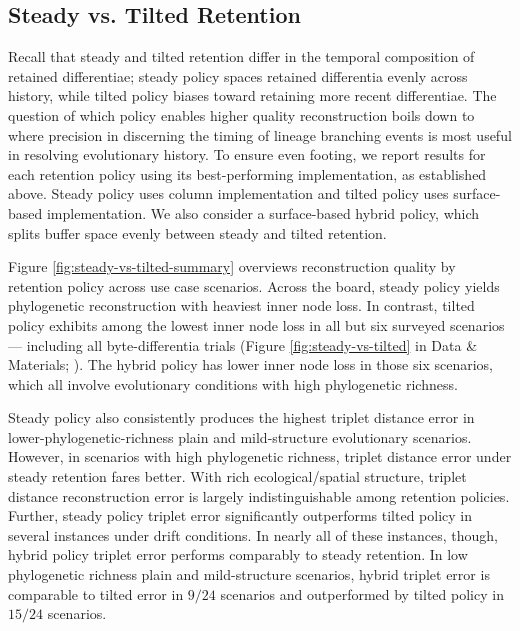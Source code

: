 
\subsection{Steady vs. Tilted Retention} \label{sec:steady-vs-tilted}



Recall that steady and tilted retention differ in the temporal composition of retained differentiae;
steady policy spaces retained differentia evenly across history, while tilted policy biases toward retaining more recent differentiae.
The question of which policy enables higher quality reconstruction boils down to where precision in discerning the timing of lineage branching events is most useful in resolving evolutionary history.
To ensure even footing, we report results for each retention policy using its best-performing implementation, as established above.
Steady policy uses column implementation and tilted policy uses surface-based implementation.
We also consider a surface-based hybrid policy, which splits buffer space evenly between steady and tilted retention.

Figure \ref{fig:steady-vs-tilted-summary} overviews reconstruction quality by retention policy across use case scenarios.
Across the board, steady policy yields phylogenetic reconstruction with heaviest inner node loss.
In contrast, tilted policy exhibits among the lowest inner node loss in all but six surveyed scenarios --- including all byte-differentia trials (Figure \ref{fig:steady-vs-tilted} in Data \& Materials; \citep{moreno2024supplemental}).
The hybrid policy has lower inner node loss in those six scenarios, which all involve evolutionary conditions with high phylogenetic richness.

Steady policy also consistently produces the highest triplet distance error in lower-phylogenetic-richness plain and mild-structure evolutionary scenarios.
However, in scenarios with high phylogenetic richness, triplet distance error under steady retention fares better.
With rich ecological/spatial structure, triplet distance reconstruction error is largely indistinguishable among retention policies.
Further, steady policy triplet error significantly outperforms tilted policy in several instances under drift conditions.
In nearly all of these instances, though, hybrid policy triplet error performs comparably to steady retention.
In low phylogenetic richness plain and mild-structure scenarios, hybrid triplet error is comparable to tilted error in $9 / 24$ scenarios and outperformed by tilted policy in $15 / 24$ scenarios.


